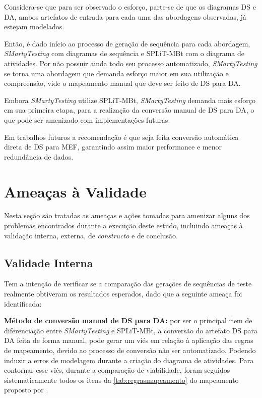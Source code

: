 Considera-se que para ser observado o esforço, parte-se de que os diagramas DS e DA, ambos artefatos de entrada para cada uma das abordagens observadas, já estejam modelados.

Então, é dado início ao processo de geração de sequência para cada abordagem, \textit{SMartyTesting} com diagramas de sequência e SPLiT-MBt com o diagrama de atividades. Por não possuir ainda todo seu processo automatizado, \textit{SMartyTesting} se torna uma abordagem que demanda esforço maior em sua utilização e compreensão, vide o mapeamento manual que deve ser feito de DS para DA.

Embora \textit{SMartyTesting} utilize SPLiT-MBt, \textit{SMartyTesting} demanda mais esforço em sua primeira etapa, para a realização da conversão manual de DS para DA, o que pode ser amenizado com implementações futuras.

Em trabalhos futuros a recomendação é que seja feita conversão automática direta de DS para MEF, garantindo assim maior performance e menor redundância de dados.

\section{Ameaças à Validade}
Nesta seção são tratadas as ameaças e ações tomadas para amenizar alguns dos problemas encontrados durante a execução deste estudo, incluindo ameaças à validação interna, externa, de \textit{constructo} e de conclusão.

\subsection{Validade Interna}

Tem a intenção de verificar se a comparação das gerações de sequências de teste realmente obtiveram os resultados esperados, dado que a seguinte ameaça foi identificada:

\textbf{Método de conversão manual de DS para DA:} por ser o principal item de diferenciação entre \textit{SMartyTesting} e SPLiT-MBt, a conversão do artefato DS para DA feita de forma manual, pode gerar um viés em relação à aplicação das regras de mapeamento, devido ao processo de conversão não ser automatizado. Podendo induzir a erros de modelagem durante a criação do diagrama de atividades. Para contornar esse viés, durante a comparação de viabilidade, foram seguidos sistematicamente todos os itens da \ref{tab:regrasmapeamento} do mapeamento proposto por \citet{garousi2005control}.

